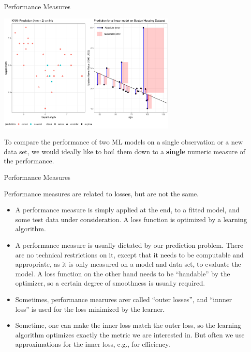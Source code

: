 

\begin{frame}{Performance Measures}

\begin{centering}
\includegraphics[width=9cm,page=1]{plots/make_classif_regr_error_intro_plot.pdf}
\end{centering}

To compare the performance of two ML models on a single observation or a
new data set, we would ideally like to boil them down to a
\textbf{single} numeric measure of the performance.

\end{frame}

\begin{frame}{Performance Measures}


Performance measures are related to losses, but are not the same.

\begin{itemize}

\item A performance measure is simply applied at the end, to a fitted model, and some 
  test data under consideration. A loss function is optimized by a learning algorithm.

\item A performance measure is usually dictated by our prediction problem. There are no technical 
  restrictions on it, except that it needs to be computable and appropriate, as it is only
  measured on a model and data set, to evaluate the model.
  A loss function on the other hand needs to be \enquote{handable} by the optimizer, so a certain
  degree of smoothness is usually required.

\item Sometimes, performance mearures arer called \enquote{outer losses},
  and \enquote{innner loss} is used for the loss minimized by the learner.

\item Sometime, one can make the inner loss match the outer loss, so the learning algorithm 
  optimizes exactly the metric we are interested in. But often we use approximations for the
  inner loss, e.g., for efficiency.

\end{itemize}

\end{frame}


